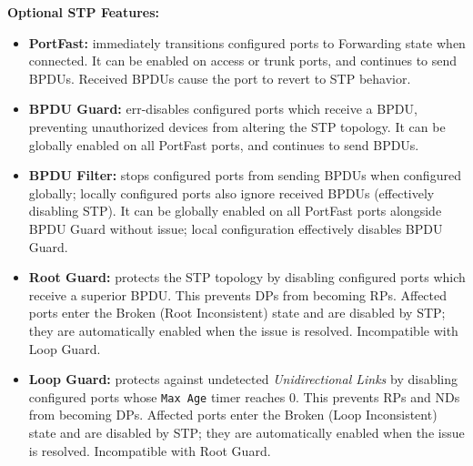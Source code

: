 \documentclass[12pt]{article}
\begin{document}
	\textbf{Optional STP Features:}
	\begin{itemize}
		\label{itm:STP FEATURES}
		\item{\textbf{PortFast:} immediately transitions configured ports to Forwarding state when connected. It can be enabled on access or trunk ports, and continues to send BPDUs. Received BPDUs cause the port to revert to STP behavior.}
		\item{\textbf{BPDU Guard:} err-disables configured ports which receive a BPDU, preventing unauthorized devices from altering the STP topology. It can be globally enabled on all PortFast ports, and continues to send BPDUs.}
		\item{\textbf{BPDU Filter:} stops configured ports from sending BPDUs when configured globally; locally configured ports also ignore received BPDUs (effectively disabling STP). It can be globally enabled on all PortFast ports alongside BPDU Guard without issue; local configuration effectively disables BPDU Guard.}
		\item{\textbf{Root Guard:} protects the STP topology by disabling configured ports which receive a superior BPDU. This prevents DPs from becoming RPs. Affected ports enter the Broken (Root Inconsistent) state and are disabled by STP; they are automatically enabled when the issue is resolved. Incompatible with Loop Guard.}
		\item{\textbf{Loop Guard:} protects against undetected \textit{Unidirectional Links} by disabling configured ports whose \texttt{Max Age} timer reaches 0. This prevents RPs and NDs from becoming DPs. Affected ports enter the Broken (Loop Inconsistent) state and are disabled by STP; they are automatically enabled when the issue is resolved. Incompatible with Root Guard.}
	\end{itemize}


\end{document}
